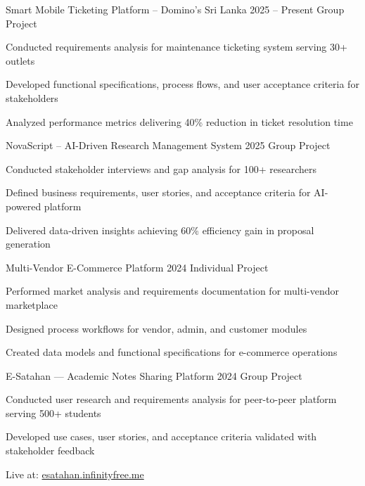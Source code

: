 \documentclass[letterpaper,10.8pt]{article}
\begin{document}
{Smart Mobile Ticketing Platform – Domino's Sri Lanka}
{2025 – Present}
{Group Project}{
  \item Conducted requirements analysis for maintenance ticketing system serving 30+ outlets
  \item Developed functional specifications, process flows, and user acceptance criteria for stakeholders
  \item Analyzed performance metrics delivering 40\% reduction in ticket resolution time
}

\vspace{8pt}

{NovaScript – AI-Driven Research Management System}
{2025}
{Group Project}{
  \item Conducted stakeholder interviews and gap analysis for 100+ researchers
  \item Defined business requirements, user stories, and acceptance criteria for AI-powered platform
  \item Delivered data-driven insights achieving 60\% efficiency gain in proposal generation
}

\vspace{8pt}

{Multi-Vendor E-Commerce Platform}
{2024}
{Individual Project}{
  \item Performed market analysis and requirements documentation for multi-vendor marketplace
  \item Designed process workflows for vendor, admin, and customer modules
  \item Created data models and functional specifications for e-commerce operations
}

\newpage

{E-Satahan — Academic Notes Sharing Platform}
{2024}
{Group Project}{
  \item Conducted user research and requirements analysis for peer-to-peer platform serving 500+ students
  \item Developed use cases, user stories, and acceptance criteria validated with stakeholder feedback
  \item Live at: \href{https://esatahan.infinityfree.me}{esatahan.infinityfree.me}
}

\vspace{8pt}
\end{document}
